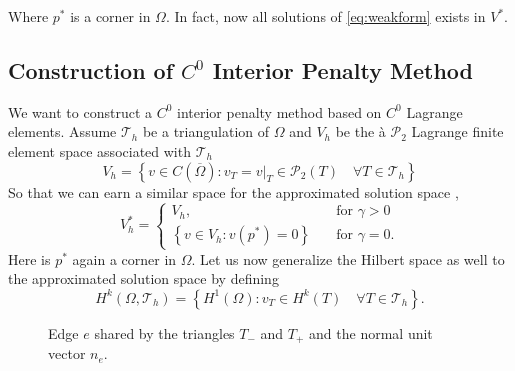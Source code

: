Where $p^{*}$  is a corner in $\Omega $. In fact, now all solutions of \eqref{eq:weakform} exists in $V^{*}$.


\subsection{Construction of $C^{0}$ Interior Penalty Method}%
\label{sub:construction_interior_penalty_method}

We want to construct a $C^{0}$ interior penalty method based on $C^{0}$ Lagrange elements.
Assume $\mathcal{T}_{h} $ be a triangulation of $\Omega $ and $V_{h}$ be the à $\mathcal{P}_{2} $ Lagrange finite
element space associated with $\mathcal{T}_{h} $ \[
V_{h} = \left\{ v \in C\left( \overline{\Omega } \right) : v_{T} = v |_{T} \in \mathcal{P}_{2}\left( T \right) \quad
\forall T \in  \mathcal{T} _{h}  \right\}
\]
So that we can earn a similar space for the approximated solution space ,
\[
V_{h}^{*} = \begin{cases}
    V_{h}, \quad & \text{for } \gamma >0\\
    \left\{ v \in V_{h}: v\left( p^{*} \right) = 0 \right\} \quad & \text{for } \gamma = 0.
\end{cases}
\]
Here is $p^{*}$ again a corner in $\Omega $. Let us now generalize the Hilbert space as well to the approximated
solution space by defining \[
H^{k}\left( \Omega , \mathcal{T} _{h}  \right) = \left\{ H^{1}\left( \Omega  \right): v_{T} \in H^{k}\left( T
\right)\quad \forall T \in \mathcal{T} _{h} \right\}.
\]
\begin{figure}[!h]
\centering
{}
\caption{Edge $e$ shared by the triangles $T_{-}$ and $T_{+}$ and the normal unit vector $n_{e}$.  }
    \label{fig:normal}
\end{figure}

